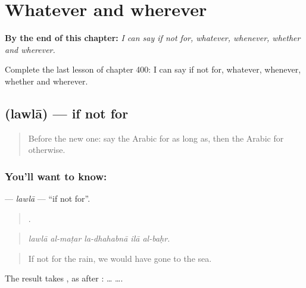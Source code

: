 
\chapter{Whatever and wherever}
\label{ch:ar-whatever-and-wherever}

\begin{chapteropening}
\textbf{By the end of this chapter:} \emph{I can say if not for, whatever, whenever, whether and wherever.}

Complete the last lesson of chapter 400: I can say if not for, whatever, whenever, whether and wherever.
\end{chapteropening}

\section[\texorpdfstring{\ar{لولا} (lawlā)}{لولا (lawlā)}]{ (lawlā) — if not for}

\label{lesson:AR-C400-lawla}



\begin{quote}
Before the new one: say the Arabic for as long as, then the Arabic for otherwise.
\end{quote}

\subsection*{You'll want to know: }
\textbf{} — \emph{lawlā} — \textquotedblleft{}if not for\textquotedblright{}.

\begin{quote}
    .
\end{quote}

\begin{quote}
\emph{lawlā al-maṭar la-dhahabnā ilā al-baḥr.}
\end{quote}

\begin{quote}
If not for the rain, we would have gone to the sea.
\end{quote}

The result takes , as after :  …  ….

